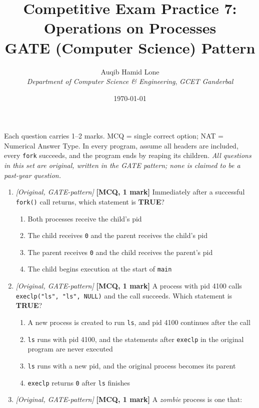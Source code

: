 \documentclass[11pt]{article}
\title{Competitive Exam Practice 7: Operations on Processes\\\large GATE (Computer Science) Pattern}
\author{Auqib Hamid Lone\\[0.3em]
  \emph{Department of Computer Science \& Engineering}, \emph{GCET Ganderbal}}
\date{\today}
\begin{document}
\maketitle

\noindent Each question carries 1--2 marks. MCQ = single correct option; NAT = Numerical Answer Type. In every program, assume all headers are included, every \texttt{fork} succeeds, and the program ends by reaping its children. \emph{All questions in this set are original, written in the GATE pattern; none is claimed to be a past-year question.}

\begin{enumerate}
\item[\textbf{Q1}] \textit{[Original, GATE-pattern]} \textbf{[MCQ, 1 mark]} Immediately after a successful \texttt{fork()} call returns, which statement is \textbf{TRUE}?

\begin{enumerate}
  \item[(A)] Both processes receive the child's pid
  \item[(B)] The child receives \texttt{0} and the parent receives the child's pid
  \item[(C)] The parent receives \texttt{0} and the child receives the parent's pid
  \item[(D)] The child begins execution at the start of \texttt{main}
\end{enumerate}

\item[\textbf{Q2}] \textit{[Original, GATE-pattern]} \textbf{[MCQ, 1 mark]} A process with pid 4100 calls \texttt{execlp("ls", "ls", NULL)} and the call succeeds. Which statement is \textbf{TRUE}?

\begin{enumerate}
  \item[(A)] A new process is created to run \texttt{ls}, and pid 4100 continues after the call
  \item[(B)] \texttt{ls} runs with pid 4100, and the statements after \texttt{execlp} in the original program are never executed
  \item[(C)] \texttt{ls} runs with a new pid, and the original process becomes its parent
  \item[(D)] \texttt{execlp} returns \texttt{0} after \texttt{ls} finishes
\end{enumerate}

\item[\textbf{Q3}] \textit{[Original, GATE-pattern]} \textbf{[MCQ, 1 mark]} A \emph{zombie} process is one that:


\end{enumerate}
\end{document}
